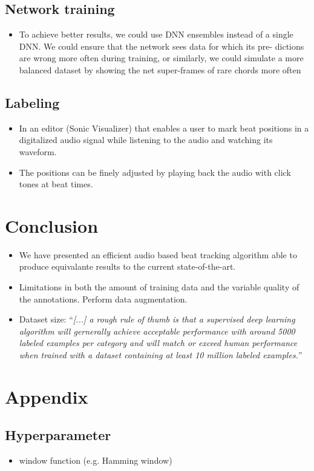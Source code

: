 \documentclass{scrartcl}
\begin{document}
\subsection{Network training}

\begin{itemize}
\item To achieve better results, we could use DNN ensembles instead of a single DNN. We could ensure that the network sees data for which its pre- dictions are wrong more often during training, or similarly, we could simulate a more balanced dataset by showing the net super-frames of rare chords more often \cite{Korzeniowski2016}
\end{itemize}



\subsection{Labeling}

\begin{itemize}
\item In an editor (Sonic Visualizer) that enables a user to mark beat positions in a digitalized audio signal while listening to the audio and watching its waveform.
\item The positions can be finely adjusted by playing back the audio with click tones at beat times.
\end{itemize}


\section{Conclusion}

\begin{itemize}
\item We have presented an efficient audio based beat tracking algorithm able to produce equivalante results to the current state-of-the-art. 
\item Limitations in both the amount of training data and the variable quality of the annotations. Perform data augmentation. 
\item Dataset size: ``\emph{[...] a rough rule of thumb is that a supervised deep learning algorithm will gernerally achieve acceptable performance with around 5000 labeled examples per category and will match or exceed human performance when trained with a dataset containing at least 10 million labeled examples.}'' \cite[Goodfellow2016]{Goodfellow2016}
\end{itemize}

\newpage

\section{Appendix}

\subsection{Hyperparameter} 
\begin{itemize}
\item window function (e.g. Hamming window)
\end{itemize}

\newpage 


\end{document}
